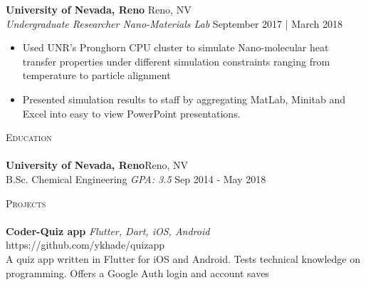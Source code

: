 \documentclass[a4paper]{article}
\newcommand{\lineunder} {
    \vspace*{-8pt} \\
    \hspace*{-18pt} \hrulefill \\
}
\newcommand{\header} [1] {
    {\hspace*{-18pt}\vspace*{6pt} \textsc{#1}}
    \vspace*{-6pt} \lineunder
}
\begin{document}
\textbf{University of Nevada, Reno} \hfill Reno, NV\\
\textit{Undergraduate Researcher \textbar{} Nano-Materials Lab} \hfill September 2017 | March 2018\\
\vspace{-1mm}
\begin{itemize} \itemsep 1pt
	\item Used UNR’s Pronghorn CPU cluster to simulate Nano-molecular heat transfer properties under different simulation constraints ranging from temperature to particle alignment
	\item Presented simulation results to staff by aggregating MatLab, Minitab and Excel into easy to view PowerPoint presentations.
\end{itemize}



\header{Education}
\textbf{University of Nevada, Reno}\hfill Reno, NV\\
B.Sc. Chemical Engineering \textit{GPA: 3.5} \hfill Sep 2014 - May 2018\\
\vspace{2mm}

\header{Projects}
{\textbf{Coder-Quiz app}} {\sl Flutter, Dart, iOS, Android} \hfill https://github.com/ykhade/quizapp\\
A quiz app written in Flutter for iOS and Android. Tests technical knowledge on programming. Offers a Google Auth login and account saves\\
\vspace*{2mm}




\ 
\end{document}
